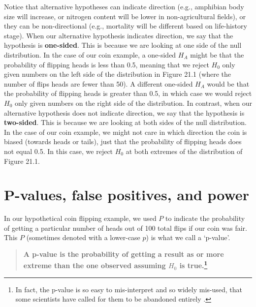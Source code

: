\documentclass[
]{scrbook}
\begin{document}
Notice that alternative hypotheses can indicate direction (e.g., amphibian body size will increase, or nitrogen content will be lower in non-agricultural fields), or they can be non-directional (e.g., mortality will be different based on life-history stage).
When our alternative hypothesis indicates direction, we say that the hypothesis is \textbf{one-sided}.
This is because we are looking at one side of the null distribution.
In the case of our coin example, a one-sided \(H_{A}\) might be that the probability of flipping heads is less than 0.5, meaning that we reject \(H_{0}\) only given numbers on the left side of the distribution in Figure 21.1 (where the number of flips heads are fewer than 50).
A different one-sided \(H_{A}\) would be that the probability of flipping heads is greater than 0.5, in which case we would reject \(H_{0}\) only given numbers on the right side of the distribution.
In contrast, when our alternative hypothesis does not indicate direction, we say that the hypothesis is \textbf{two-sided}.
This is because we are looking at both sides of the null distribution.
In the case of our coin example, we might not care in which direction the coin is biased (towards heads or tails), just that the probability of flipping heads does not equal 0.5.
In this case, we reject \(H_{0}\) at both extremes of the distribution of Figure 21.1.

\hypertarget{p-values-false-positives-and-power}{%
\section{P-values, false positives, and power}\label{p-values-false-positives-and-power}}

In our hypothetical coin flipping example, we used \(P\) to indicate the probability of getting a particular number of heads out of 100 total flips if our coin was fair.
This \(P\) (sometimes denoted with a lower-case \(p\)) is what we call a `p-value'.

\begin{quote}
\textbf{A p-value is the probability of getting a result as or more extreme than the one observed assuming \(H_{0}\) is true.\footnote{In fact, the p-value is so easy to mis-interpret and so widely mis-used, that some scientists have called for them to be abandoned entirely \citetext{\citealp{Wasserstein2016}; \citealp[but see][]{Stanton-Geddes2014}; \citealp{Mayo2019}}.}}
\end{quote}
\end{document}
